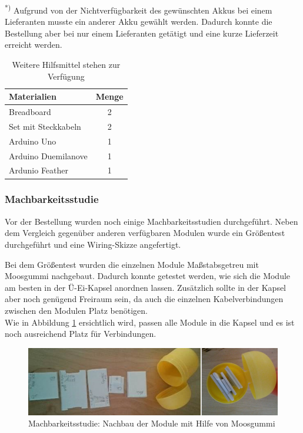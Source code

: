 \textsuperscript{*)} Aufgrund von der Nichtverfügbarkeit des gewünschten Akkus bei einem Lieferanten musste ein anderer Akku gewählt werden. Dadurch konnte die Bestellung aber bei nur einem Lieferanten getätigt und eine kurze Lieferzeit erreicht werden.

\begin{table}[h]
	\centering
	\begin{tabular}{|l|c|}
		\hline
		\textbf{Materialien} & \textbf{Menge} \\
		\hline
		Breadboard & 2 \\
		\hline
		Set mit Steckkabeln & 2 \\
		\hline
		Arduino Uno & 1 \\
		\hline	
		Arduino Duemilanove & 1 \\
		\hline	
		Ardunio Feather & 1\\
		\hline
	\end{tabular}
	\caption{Weitere Hilfsmittel stehen zur Verfügung}
	\label{tab:verfuegbareHW}
\end{table}

\subsubsection{Machbarkeitsstudie}

Vor der Bestellung wurden noch einige Machbarkeitsstudien durchgeführt. Neben dem Vergleich gegenüber anderen verfügbaren Modulen wurde ein Größentest durchgeführt und eine Wiring-Skizze angefertigt.

Bei dem Größentest wurden die einzelnen Module Maßstabsgetreu mit Moosgummi nachgebaut. Dadurch konnte getestet werden, wie sich die Module am besten in der Ü-Ei-Kapsel anordnen lassen. Zusätzlich sollte in der Kapsel aber noch genügend Freiraum sein, da auch die einzelnen Kabelverbindungen zwischen den Modulen Platz benötigen.  \\
Wie in Abbildung \ref{fig:k3_machbarkeitsstudie} ersichtlich wird, passen alle Module in die Kapsel und es ist noch ausreichend Platz für Verbindungen.

\begin{figure}[ht]
	\centering
	\includegraphics[width=1\textwidth]{images/k3-machbarkeitsstudie.PNG}
	\caption {Machbarkeitsstudie: Nachbau der Module mit Hilfe von Moosgummi}
	\label{fig:k3_machbarkeitsstudie}
\end{figure}

